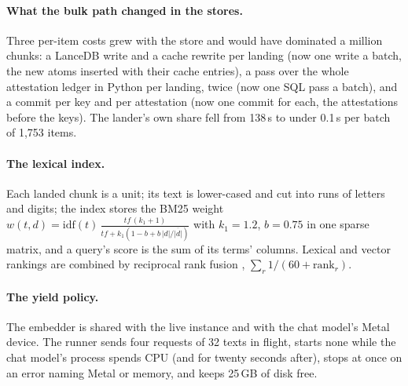 \documentclass[11pt]{article}
\theoremstyle{plain}
\theoremstyle{definition}
\theoremstyle{remark}
\begin{document}
\paragraph{What the bulk path changed in the stores.}
Three per-item costs grew with the store and would have dominated a million chunks: a LanceDB write
and a cache rewrite per landing (now one write a batch, the new atoms inserted with their cache
entries), a pass over the whole attestation ledger in Python per landing, twice (now one SQL pass a
batch), and a commit per key and per attestation (now one commit for each, the attestations before the
keys). The lander's own share fell from 138\,s to under 0.1\,s per batch of 1,753 items.

\paragraph{The lexical index.}
Each landed chunk is a unit; its text is lower-cased and cut into runs of letters and digits; the
index stores the BM25 weight \citep{robertson2009bm25}
$w(t,d)=\mathrm{idf}(t)\,\frac{tf\,(k_1+1)}{tf+k_1(1-b+b\,|d|/\overline{|d|})}$ with $k_1=1.2$,
$b=0.75$ in one sparse matrix, and a query's score is the sum of its terms' columns. Lexical and vector
rankings are combined by reciprocal rank fusion \citep{cormack2009rrf}, $\sum_r 1/(60+\mathrm{rank}_r)$.

\paragraph{The yield policy.}
The embedder is shared with the live instance and with the chat model's Metal device. The runner sends
four requests of 32 texts in flight, starts none while the chat model's process spends CPU (and for
twenty seconds after), stops at once on an error naming Metal or memory, and keeps 25\,GB of disk free.
\end{document}
